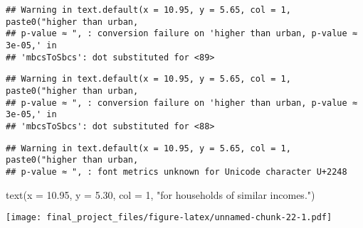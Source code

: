 \documentclass[
]{article}
\newenvironment{Shaded}{\begin{snugshade}}{\end{snugshade}}
\newcommand{\AttributeTok}[1]{\textcolor[rgb]{0.77,0.63,0.00}{#1}}
\newcommand{\DecValTok}[1]{\textcolor[rgb]{0.00,0.00,0.81}{#1}}
\newcommand{\FloatTok}[1]{\textcolor[rgb]{0.00,0.00,0.81}{#1}}
\newcommand{\FunctionTok}[1]{\textcolor[rgb]{0.00,0.00,0.00}{#1}}
\newcommand{\NormalTok}[1]{#1}
\newcommand{\StringTok}[1]{\textcolor[rgb]{0.31,0.60,0.02}{#1}}
\begin{document}
\begin{verbatim}
## Warning in text.default(x = 10.95, y = 5.65, col = 1, paste0("higher than urban,
## p-value ≈ ", : conversion failure on 'higher than urban, p-value ≈ 3e-05,' in
## 'mbcsToSbcs': dot substituted for <89>
\end{verbatim}

\begin{verbatim}
## Warning in text.default(x = 10.95, y = 5.65, col = 1, paste0("higher than urban,
## p-value ≈ ", : conversion failure on 'higher than urban, p-value ≈ 3e-05,' in
## 'mbcsToSbcs': dot substituted for <88>
\end{verbatim}

\begin{verbatim}
## Warning in text.default(x = 10.95, y = 5.65, col = 1, paste0("higher than urban,
## p-value ≈ ", : font metrics unknown for Unicode character U+2248
\end{verbatim}

\begin{Shaded}
\begin{Highlighting}[]
\FunctionTok{text}\NormalTok{(}\AttributeTok{x =} \FloatTok{10.95}\NormalTok{, }\AttributeTok{y =} \FloatTok{5.30}\NormalTok{, }\AttributeTok{col =} \DecValTok{1}\NormalTok{, }\StringTok{"for households of similar incomes."}\NormalTok{)}
\end{Highlighting}
\end{Shaded}

\texttt{[image: final\_project\_files/figure-latex/unnamed-chunk-22-1.pdf]}
\end{document}

